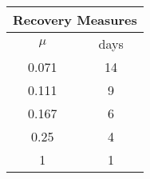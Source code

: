 \documentclass[a4paper,10pt,twoside]{book} %
\theoremstyle{definition}
\begin{document}
\begin{center}
	\begin{tabular}{||c|c||}
		\hline
		\multicolumn{2}{|c|}{Recovery Measures}\\
		\hline
		\multicolumn{1}{|c|}{$ \mu$ } & \multicolumn{1}{c|}{days}\\
		\hline
		0.071 &  14\\ 
		\hline
		0.111 & 9 \\
		\hline
		0.167 & 6 \\
		\hline
		0.25 & 4 \\
		\hline
		1 & 1 \\
		\hline
	\end{tabular}
\end{center}




\end{document}
